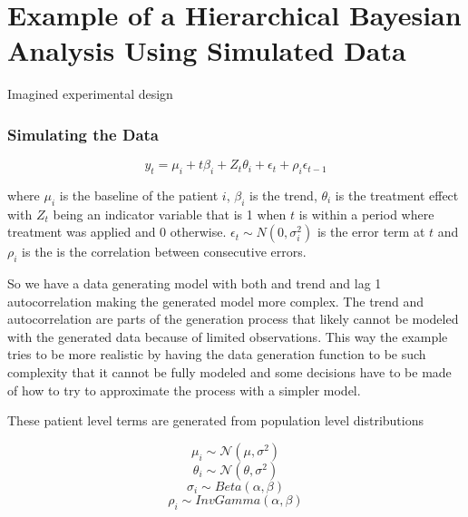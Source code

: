 \documentclass[12pt,a4paper,leqno]{report}
\theoremstyle{plain}
\theoremstyle{definition}
\theoremstyle{remark}
\begin{document}
\chapter{Example of a Hierarchical Bayesian Analysis Using Simulated Data}\label{example}

Imagined experimental design

\subsection{Simulating the Data}

\begin{def}\label{simulationmodel}
    \begin{equation}\label{}
        y_t = \mu_i + t\beta_i + Z_t\theta_i + \epsilon_t + \rho_i\epsilon_{t-1}
    \end{equation}
\end{def}where \(\mu_i\) is the baseline of the patient \(i\), \(\beta_i\) is the trend,
\(\theta_i\) is the treatment effect with \(Z_t\) being an indicator variable that is 1
when \(t\) is within a period where treatment was applied and 0 otherwise. \(\epsilon_t
\sim N(0,\sigma_i^2) \) is the error term at \(t\) and \(\rho_i\) is the is the
correlation between consecutive errors.

So we have a data generating model with both and trend and lag 1 autocorrelation making
the generated model more complex. The trend and autocorrelation are parts of the
generation process that likely cannot be modeled with the generated data because of
limited observations. This way the example tries to be more realistic by having the data
generation function to be such complexity that it cannot be fully modeled and some
decisions have to be made of how to try to approximate the process with a simpler model.

These patient level terms are generated from population level distributions

\begin{def}\label{populationparameters}
    \begin{equation}
        \mu_i \sim \mathcal{N}(\mu,\sigma^2)
    \end{equation}
    \begin{equation}
        \theta_i \sim \mathcal{N}(\theta,\sigma^2)
    \end{equation}
    \begin{equation}
        \sigma_i \sim Beta(\alpha, \beta)
    \end{equation}
    \begin{equation}
        \rho_i \sim InvGamma(\alpha, \beta)
    \end{equation}
\end{def}
\end{document}
